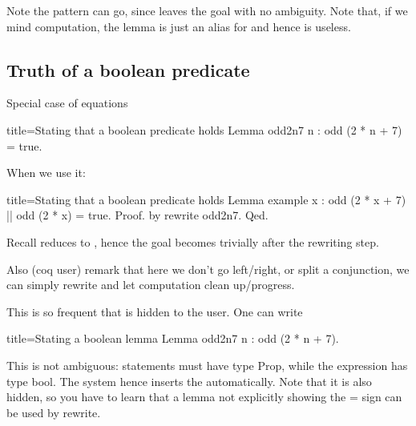 Note the pattern can go, since \C{/=} leaves the goal with
no ambiguity.
Note that, if we mind computation, the lemma is just an alias
for  and hence is useless.

\subsection{Truth of a boolean predicate}

Special case of equations

\begin{coq}{title=Stating that a boolean predicate holds}
Lemma odd2n7 n : odd (2 * n + 7) = true.
\end{coq}

When we use it:

\begin{coq}{title=Stating that a boolean predicate holds}
Lemma example x : odd (2 * x + 7) || odd (2 * x) = true.
Proof. by rewrite odd2n7. Qed.
\end{coq}

Recall  reduces to , hence the
goal becomes trivially  after the
rewriting step.

Also (coq user) remark that here we don't go left/right, or split
a conjunction, we can simply rewrite and let computation clean up/progress.

This is so frequent that  is hidden to the user.
One can write

\begin{coq}{title=Stating a boolean lemma}
Lemma odd2n7 n : odd (2 * n + 7).
\end{coq}

This is not ambiguous: statements must have type Prop, while
the expression has type bool.  The system hence inserts
the  automatically.  Note that it is also hidden,
so you have to learn that a lemma not explicitly showing the
= sign can be used by rewrite.

